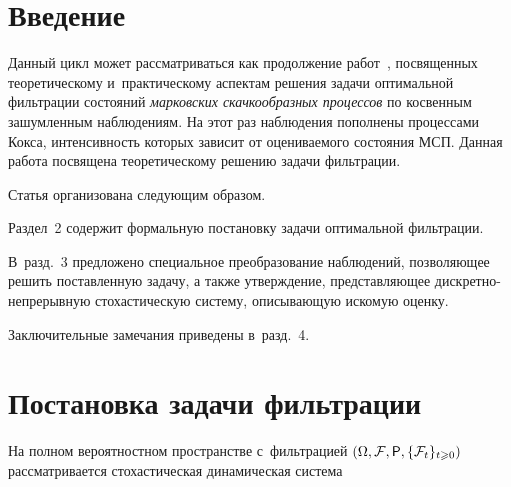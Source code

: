 

\vspace*{8pt}



\thispagestyle{headings}

\begin{multicols}{2}

\label{st\stat}


 \section{Введение}
 
 
 Данный цикл может рассматриваться как продолжение работ~\cite{B_19_1_IA, B_20_2_IA, B_20_3_IA},
 посвященных тео\-ре\-ти\-че\-скому и~практическому аспектам решения задачи оптимальной фильтрации состояний 
 \textit{марковских скачкообразных процессов} по косвенным зашумленным наблюдениям. На 
 этот раз наблюдения пополнены процессами Кокса, интенсивность которых зависит от оцениваемого состояния 
 МСП. Данная работа посвящена тео\-ре\-ти\-че\-ско\-му решению задачи фильтрации.

 Статья организована следующим образом. 
 
 Раздел~2 содержит формальную постановку задачи 
 оптимальной фильтрации. 
 
 В~разд.~3 предложено специальное преобразование наблюдений, позволяющее 
 решить поставленную задачу, а также утверждение, представляющее дис\-крет\-но-не\-пре\-рыв\-ную 
 стохастическую систему, описывающую искомую оценку. 
 
 Заключительные замечания приведены в~разд.~4.

 \section{Постановка задачи фильтрации}
 
 \vspace*{5pt}
 
  На полном вероятностном пространстве с~фильт\-ра\-цией 
  $(\Omega,\mathcal{F},{\sf P},\{\mathcal{F}_t\}_{t \geqslant 0})$ 
  рассматривается стохастическая динамическая система
  
  \vspace*{-6pt}
  

\end{multicols}
